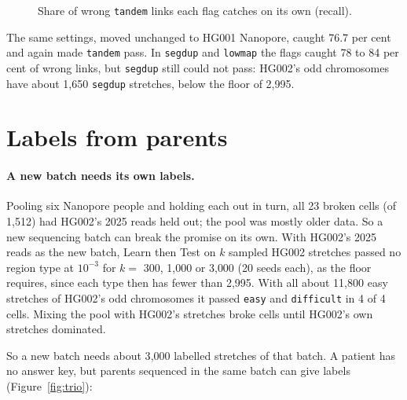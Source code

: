 \documentclass[11pt]{article}
\newcommand{\grp}[1]{\texttt{#1}}
\newcommand{\failbar}[5]{%
  \node[anchor=east,font=\scriptsize,align=right] at (-0.03,#1) {#2};
  \fill[gray!20] (0,#1-0.13) rectangle (1,#1+0.13);
  \fill[#5] (0,#1-0.13) rectangle ({max(#3,0.008)},#1+0.13);
  \node[anchor=west,font=\scriptsize\bfseries,text=#5] at (1.03,#1) {#4};}
\begin{document}
\begin{figure}[h]
\centering
{}
\caption{Share of wrong \grp{tandem} links each flag catches on its own
(recall).}
\label{fig:flags}
\end{figure}

The same settings, moved unchanged to HG001 Nanopore, caught
76.7 per cent and again made \grp{tandem} pass. In \grp{segdup} and
\grp{lowmap} the flags caught 78 to 84 per cent of wrong links, but
\grp{segdup} still could not pass: HG002's odd chromosomes have about 1{,}650
\grp{segdup} stretches, below the floor of 2{,}995.

\section{Labels from parents}\label{sec:parents}

\paragraph{A new batch needs its own labels.} Pooling six Nanopore people and
holding each out in turn, all 23 broken cells (of 1{,}512) had HG002's 2025
reads held out; the pool was mostly older data. So a new sequencing batch
can break the promise on its own. With HG002's 2025 reads as the new batch,
Learn then Test on $k$ sampled HG002 stretches
passed no region type at $10^{-3}$ for $k=$ 300, 1{,}000 or 3{,}000 (20 seeds
each), as the floor requires, since each type then has fewer than 2{,}995.
With all about 11{,}800 easy stretches of HG002's odd chromosomes it passed
\grp{easy} and \grp{difficult} in 4 of 4 cells. Mixing the pool with HG002's
stretches broke cells until HG002's own stretches dominated.

So a new batch needs about 3{,}000 labelled stretches of that batch. A
patient has no answer key, but parents sequenced in the same batch can give
labels (Figure~\ref{fig:trio}):
\end{document}

